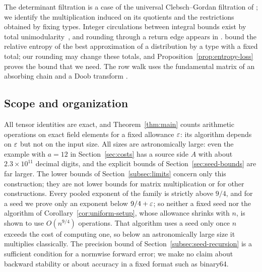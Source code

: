 The determinant filtration is a case of the universal Clebsch--Gordan
filtration of \citet[Lemma~2.5, Theorem~2.8, Corollary~2.9 and
Definition~2.10]{Maakestad23}; we identify the multiplication induced on
its quotients and the restrictions obtained by fixing types. Integer
circulations between integral bounds exist by total
unimodularity~\citep[Theorem~2]{HK56}, and rounding through a return
edge appears in \citet[Sections~2.2--3.1]{KangPayor15}.
\citet[Section~IV.D, Eq.~(42)]{BoechererGeiger16} bound the relative
entropy of the best approximation of a distribution by a type with a
fixed total; our rounding may change these totals, and
Proposition~\ref{prop:entropy-loss} proves the bound that we need. The
row walk uses the fundamental matrix of an absorbing chain
\citep[Theorem~11.4]{GrinsteadSnell97} and a Doob transform
\citep[Section~17.6.1]{LevinPeres17}.

\subsection{Scope and organization}
\label{subsec:intro-scope}

All tensor identities are exact, and Theorem~\ref{thm:main} counts
arithmetic operations on exact field elements for a fixed allowance
\(\varepsilon\): its algorithm depends on \(\varepsilon\) but not on the input size.
All sizes are astronomically large: even the example with \(a=12\) in
Section~\ref{sec:costs} has a source side \(A\) with about
\(2.3\times10^{11}\) decimal digits, and the explicit bounds of
Section~\ref{sec:seed-bounds} are far larger. The lower bounds of
Section~\ref{subsec:limits} concern only this construction; they are
not lower bounds for matrix multiplication or for other constructions.
Every pooled exponent of the family is strictly above \(9/4\), and for a seed we prove only an
exponent below \(9/4+\varepsilon\); so neither a fixed seed nor the algorithm
of Corollary~\ref{cor:uniform-setup}, whose allowance shrinks with
\(n\), is shown to use \(O(n^{9/4})\) operations. That algorithm uses
a seed only once \(n\) exceeds the cost of computing one, so below an
astronomically large size it multiplies classically. The
precision bound of Section~\ref{subsec:seed-recursion} is a sufficient
condition for a normwise forward error; we make no claim about backward
stability or about accuracy in a fixed format such as binary64.

